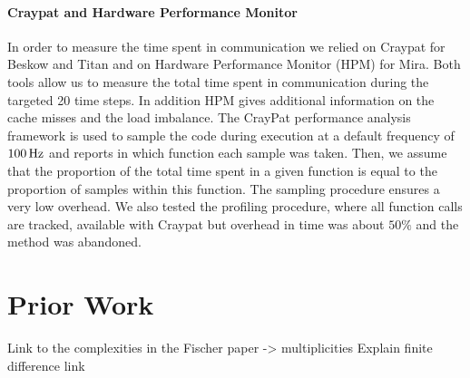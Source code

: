 \documentclass{sig-alternate}
\begin{document}
\paragraph{Craypat and Hardware Performance Monitor}
In order to measure the time spent in communication we relied on Craypat for
Beskow and Titan and on Hardware Performance Monitor (HPM) for Mira. Both tools
allow us to measure the total time spent in communication during the targeted 20 time
steps. In addition HPM gives additional information on the cache misses and the load
imbalance. The CrayPat performance analysis framework is used to sample the code during execution at a default frequency of $\unit[100]{Hz}$ and reports in which function each sample was taken. Then, we assume that the proportion of the total time spent in a given function is equal to the proportion of samples within this function. The sampling procedure ensures a very low overhead. We also tested the profiling procedure, where all function calls are tracked, available with Craypat but overhead in time was about $50\%$ and the method was abandoned.






\section{Prior Work}
Link to the complexities in the Fischer paper -> multiplicities
Explain finite difference link
\end{document}
